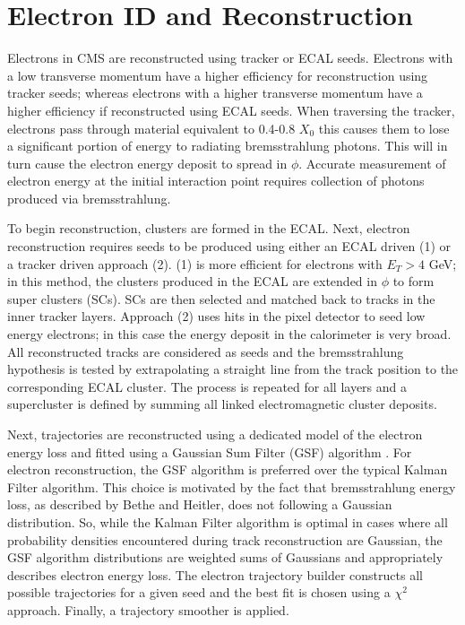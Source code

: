 \section{Electron ID and Reconstruction}
\label{sec:electronReco}
Electrons in CMS are reconstructed using tracker or ECAL seeds.
Electrons with a low transverse momentum have a higher efficiency
for reconstruction using tracker seeds; whereas electrons with a
higher transverse momentum have a higher efficiency if reconstructed
using ECAL seeds. When traversing the tracker, electrons pass through 
material equivalent to 0.4-0.8 $X_{0}$ 
this causes them to lose a significant portion of 
energy to radiating bremsstrahlung photons. 
This will in turn cause the electron energy deposit to spread in $\phi$. 
Accurate measurement of electron energy 
at the initial interaction point 
requires collection of photons produced via bremsstrahlung.

To begin reconstruction, 
clusters are formed in the ECAL. %
Next, electron reconstruction requires
seeds to be produced using either an ECAL driven (1) or a tracker driven approach (2).
(1) is more efficient for electrons with $E_{T}>4$ GeV;
in this method, the clusters produced in the ECAL are
extended in $\phi$ to form super clusters (SCs). 
SCs are then selected and matched back to tracks in the inner tracker layers. 
Approach (2) uses hits in the pixel detector to seed
low energy electrons; in this case the energy deposit in the calorimeter
is very broad. All reconstructed tracks are considered as seeds
and the bremsstrahlung hypothesis is tested
by extrapolating a straight line from the track position to the
corresponding ECAL cluster. The process is 
repeated for all layers and a supercluster is defined
by summing all linked electromagnetic cluster deposits. 

Next, trajectories are reconstructed using a dedicated
model of the electron energy loss and fitted using a Gaussian Sum Filter (GSF) algorithm \cite{GSF}. 
For electron reconstruction,
the GSF algorithm is preferred over the typical Kalman Filter algorithm.
This choice is motivated by the fact that bremsstrahlung energy loss, 
as described by Bethe and Heitler, 
does not following a Gaussian distribution. 
So, while the Kalman Filter algorithm is optimal in cases where all probability
densities encountered during track reconstruction are Gaussian,
the GSF algorithm distributions are weighted sums of Gaussians and
appropriately describes electron energy loss.
The electron trajectory builder constructs all possible trajectories
for a given seed and the best fit is chosen using a $\chi^{2}$ approach.
Finally, a trajectory smoother is applied.

